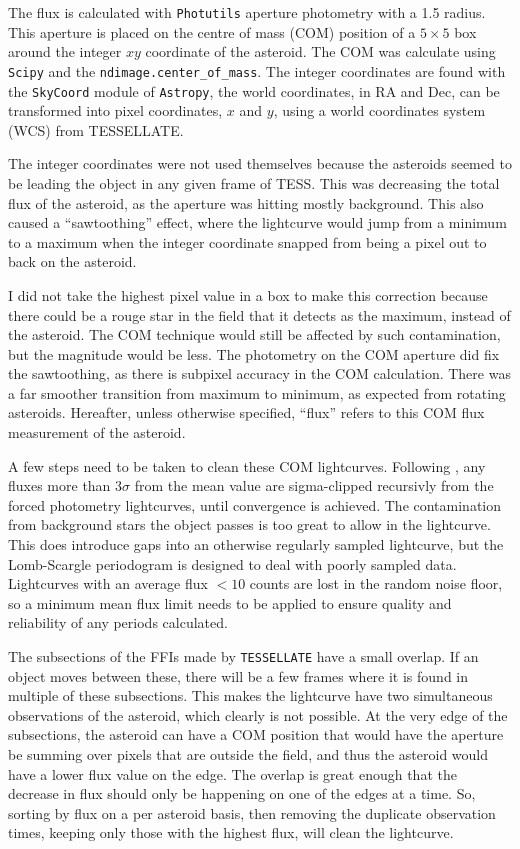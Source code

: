 \documentclass{UCreport}
\begin{document}
The flux is calculated with \texttt{Photutils} \citep{Bradley2024} aperture photometry with a \qty{1.5}{\px} radius.
This aperture is placed on the centre of mass (COM) position of a $5\times5$ \unit{\px} box around the integer $xy$ coordinate of the asteroid.
The COM was calculate using \texttt{Scipy} and the \texttt{ndimage.center\_of\_mass}.
The integer coordinates are found with the \texttt{SkyCoord} module of \texttt{Astropy}, the world coordinates, in RA and Dec, can be transformed into pixel coordinates, $x$ and $y$, using a world coordinates system (WCS) from TESSELLATE.

The integer coordinates were not used themselves because the asteroids seemed to be leading the object in any given frame of TESS. %
This was decreasing the total flux of the asteroid, as the aperture  was hitting mostly background.
This also caused a ``sawtoothing'' effect, where the lightcurve would jump from a minimum to a maximum when the integer coordinate snapped from being a pixel out to back on the asteroid.

I did not take the highest pixel value in a box to make this correction because there could be a rouge star in the field that it detects as the maximum, instead of the asteroid.
The COM technique would still be affected by such contamination, but the magnitude would be less.
The photometry on the COM aperture did fix the sawtoothing, as there is subpixel accuracy in the COM calculation.
There was a far smoother transition from maximum to minimum, as expected from rotating asteroids.
Hereafter, unless otherwise specified, ``flux'' refers to this COM flux measurement of the asteroid.


A few steps need to be taken to clean these COM lightcurves.
Following \citet{McNeill2023}, any fluxes more than $3\sigma$ from the mean value are sigma-clipped recursivly from the forced photometry lightcurves, until convergence is achieved.
The contamination from background stars the object passes is too great to allow in the lightcurve.
This does introduce gaps into an otherwise regularly sampled lightcurve, but the Lomb-Scargle periodogram is designed to deal with poorly sampled data.
Lightcurves with an average flux $<10$ counts are lost in the random noise floor, so a minimum mean flux limit needs to be applied to ensure quality and reliability of any periods calculated.


The subsections of the FFIs made by \texttt{TESSELLATE} have a small overlap.
If an object moves between these, there will be a few frames where it is found in multiple of these subsections.
This makes the lightcurve have two simultaneous observations of the asteroid, which clearly is not possible.
At the very edge of the subsections, the asteroid can have a COM position that would have the aperture be summing over pixels that are outside the field, and thus the asteroid would have a lower flux value on the edge.
The overlap is great enough that the decrease in flux should only be happening on one of the edges at a time.
So, sorting by flux on a per asteroid basis, then removing the duplicate observation times, keeping only those with the highest flux, will clean the lightcurve.
\end{document}
